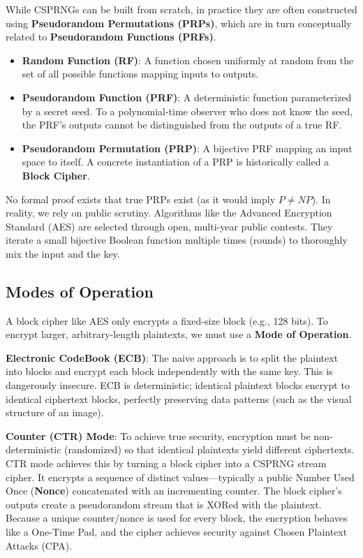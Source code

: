 While CSPRNGs can be built from scratch, in practice they are often constructed using \textbf{Pseudorandom Permutations (PRPs)}, which are in turn conceptually related to \textbf{Pseudorandom Functions (PRFs)}.
\begin{itemize}
    \item \textbf{Random Function (RF)}: A function chosen uniformly at random from the set of all possible functions mapping inputs to outputs.
    \item \textbf{Pseudorandom Function (PRF)}: A deterministic function parameterized by a secret seed. To a polynomial-time observer who does not know the seed, the PRF's outputs cannot be distinguished from the outputs of a true RF.
    \item \textbf{Pseudorandom Permutation (PRP)}: A bijective PRF mapping an input space to itself. A concrete instantiation of a PRP is historically called a \textbf{Block Cipher}.
\end{itemize}

No formal proof exists that true PRPs exist (as it would imply $P \neq NP$). In reality, we rely on public scrutiny. Algorithms like the Advanced Encryption Standard (AES) are selected through open, multi-year public contests. They iterate a small bijective Boolean function multiple times (rounds) to thoroughly mix the input and the key. 

\subsection{Modes of Operation}
A block cipher like AES only encrypts a fixed-size block (e.g., 128 bits). To encrypt larger, arbitrary-length plaintexts, we must use a \textbf{Mode of Operation}.

\textbf{Electronic CodeBook (ECB)}: The naive approach is to split the plaintext into blocks and encrypt each block independently with the same key. This is dangerously insecure. ECB is deterministic; identical plaintext blocks encrypt to identical ciphertext blocks, perfectly preserving data patterns (such as the visual structure of an image).

\textbf{Counter (CTR) Mode}: To achieve true security, encryption must be non-deterministic (randomized) so that identical plaintexts yield different ciphertexts. CTR mode achieves this by turning a block cipher into a CSPRNG stream cipher. It encrypts a sequence of distinct values—typically a public Number Used Once (\textbf{Nonce}) concatenated with an incrementing counter. The block cipher's outputs create a pseudorandom stream that is XORed with the plaintext. Because a unique counter/nonce is used for every block, the encryption behaves like a One-Time Pad, and the cipher achieves security against Chosen Plaintext Attacks (CPA).

